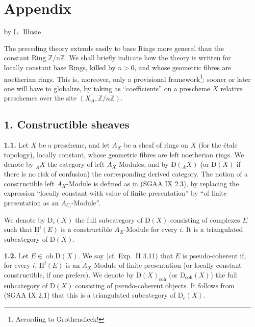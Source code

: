 \documentclass[11pt]{article}
\providecommand{\uH}{\underline{\mathrm H}}
\newcommand{\D}{\mathrm{D}}
\newcommand{\Z}{\mathbb{Z}}
\newcommand{\ob}{\operatorname{ob}}
\providecommand{\ob}{\operatorname{ob}}
\providecommand{\Z}{\mathbb Z}
\begin{document}
\section*{Appendix}
\begin{center}
by L.~Illusie
\end{center}

The preceding theory extends easily to base Rings more general than the constant Ring $\Z/n\Z$. We shall briefly indicate how the theory is written for locally constant base Rings, killed by $n>0$, and whose geometric fibres are noetherian rings. This is, moreover, only a provisional framework\footnote{According to Grothendieck!}: sooner or later one will have to globalize, by taking as ``coefficients'' on a prescheme $X$ relative preschemes over the site $(X_{\mathrm{\acute et}},\Z/n\Z)$.

\subsection*{1. Constructible sheaves}\label{sga5:I:subsection:1}

\label{sga5:I:paragraph:1.1}\textbf{1.1.} Let $X$ be a prescheme, and let $A_X$ be a sheaf of rings on $X$ (for the étale topology), locally constant, whose geometric fibres are left noetherian rings. We denote by ${}_A X$ the category of left $A_X$-Modules, and by $\D({}_A X)$ (or $\D(X)$ if there is no risk of confusion) the corresponding derived category. The notion of a constructible left $A_X$-Module is defined as in (SGAA IX 2.3), by replacing the expression ``locally constant with value of finite presentation'' by ``of finite presentation as an $A_{U_i}$-Module''.

We denote by $\D_c(X)$ the full subcategory of $\D(X)$ consisting of complexes $E$ such that $\uH^i(E)$ is a constructible $A_X$-Module for every $i$. It is a triangulated subcategory of $\D(X)$.

\label{sga5:I:paragraph:1.2}\textbf{1.2.} Let $E\in\ob\D(X)$. We say (cf. Exp.~II 3.11) that $E$ is pseudo-coherent if, for every $i$, $\uH^i(E)$ is an $A_X$-Module of finite presentation (or locally constant constructible, if one prefers). We denote by $\D(X)_{\mathrm{coh}}$ (or $\D_{\mathrm{coh}}(X)$) the full subcategory of $\D(X)$ consisting of pseudo-coherent objects. It follows from (SGAA IX 2.1) that this is a triangulated subcategory of $\D_c(X)$.
\end{document}
